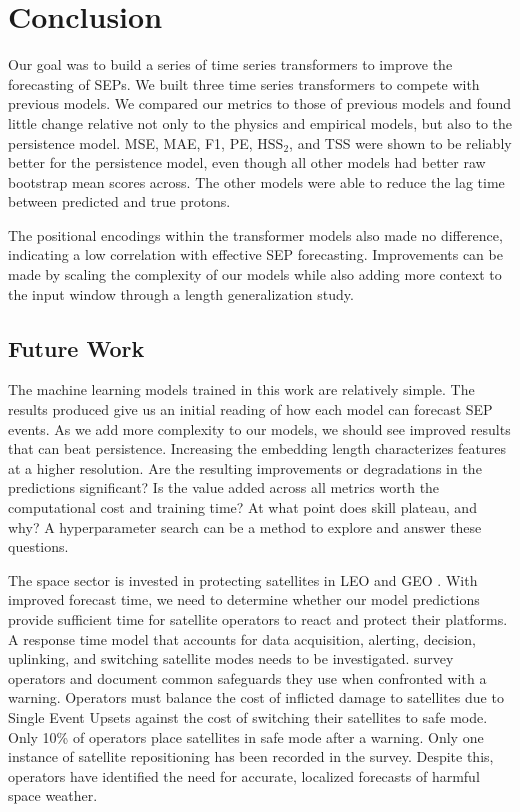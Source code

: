 \section{Conclusion}
\label{sec:conclusion}
Our goal was to build a series of time series transformers to improve the forecasting of SEPs. We built three time series transformers to compete with previous models.
We compared our metrics to those of previous models and found little change relative not only to the physics and empirical models,
but also to the persistence model. MSE, MAE, F1, PE, $\text{HSS}_2$, and TSS were shown to be reliably better for the persistence model, even though all other models had better raw bootstrap mean scores across.
The other models were able to reduce the lag time between predicted and true protons.

The positional encodings within the transformer models also made no difference, indicating a low correlation with effective SEP forecasting. Improvements can be made by scaling the complexity of our models while also adding more context
to the input window through a length generalization study.

\subsection{Future Work}
The machine learning models trained in this work are relatively simple. The results produced give us an initial reading
of how each model can forecast SEP events. As we add more complexity to our models, we should see improved results that can beat persistence.
Increasing the embedding length characterizes features at a higher resolution. Are the resulting improvements or degradations in the predictions significant?
Is the value added across all metrics worth the computational cost and training time? At what point does skill plateau, and why? A hyperparameter search
can be a method to explore and answer these questions.

The space sector is invested in protecting satellites in LEO and GEO \cite{LaNeve2026}. With improved forecast time,
we need to determine whether our model predictions provide sufficient time for satellite operators to react
and protect their platforms. A response time model that accounts for data acquisition, alerting, decision, uplinking, and switching satellite modes needs to be investigated.  survey operators and document common safeguards
they use when confronted with a warning. Operators must balance the cost of inflicted damage to satellites due to Single Event Upsets \cite{noeldeke2021single}
against the cost of switching their satellites to safe mode. Only 10\% of operators place satellites in safe mode after a warning. Only one instance of satellite repositioning has been recorded in the survey.
Despite this, operators have identified the need for accurate, localized forecasts of harmful space weather.

